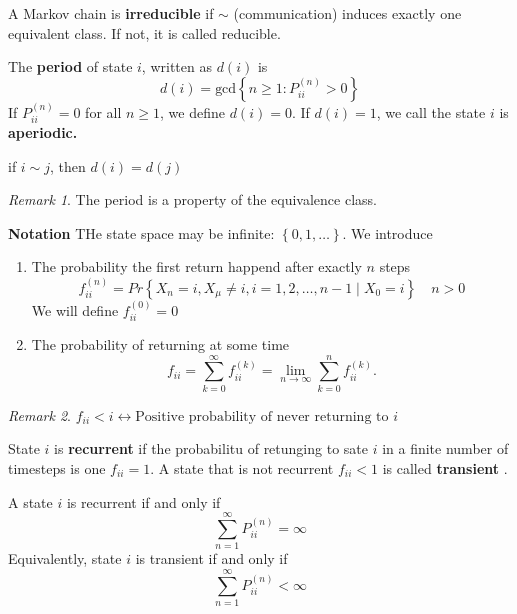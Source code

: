 \documentclass{article}
\theoremstyle{remark}
\newtheorem*{remark}{Remark}
\begin{document}
\begin{definition}
  A Markov chain is \textbf{irreducible}  if $ \sim $ (communication) induces exactly one equivalent class.  If not, it is called reducible. 
\end{definition}
\begin{definition}
  The \textbf{period}  of state $i$, written as $d\left( i \right)$ is \[
  d\left( i \right) = \text{gcd}\left\{ n \ge 1: P ^{(n)} _{ii} > 0 \right\}
  \] 
  If $P^{(n)} _{ii} = 0$ for all $n\ge 1$, we define $d\left( i \right) = 0$. If $d\left( i \right) = 1$, we call the state $i$ is \textbf{aperiodic.} 
\end{definition}
\begin{theorem}
  if $i \sim j$, then $d\left( i \right) = d\left( j \right)$
\end{theorem}
\begin{remark}
   The period is a property of the equivalence class.
\end{remark}

\textbf{Notation} THe state space may be infinite: $\left\{ 0,1, \ldots \right\}$. We introduce  
\begin{enumerate}[label=(\roman*)]
  \item The probability the first return happend after exactly $n$ steps \[
  f_{ii}^{(n)} = Pr \left \{ X_{n} = i, X_{\mu }\neq i, i  = 1,2, \ldots, n-1  \mid X_{0} = i  \right \}  \quad  n> 0 
  \] 
  We will define $f_{ii}^{(0)} = 0$
\item The probability of returning at some time \[
f_{ii} = \sum_{k= 0}^{\infty}  f_{ii}^{(k)} = \lim_{n \to  \infty}  \sum_{k= 0}^{n} f^{(k)} _{ii} .
\] 
\end{enumerate}
 \begin{remark}
   $f_{ii} < i \leftrightarrow  \text{Positive probability of never returning to $i$}$
 \end{remark}

 \begin{definition}
   State $i$ is \textbf{recurrent}  if the probabilitu of retunging to sate $i$ in a finite number of timesteps is one $f_{ii} = 1$. A state that is not recurrent $f_{ii} < 1$ is called \textbf{transient} .
 \end{definition}

 \begin{theorem}
   A state $i$ is recurrent if and only if \[
   \sum_{n=1}^{\infty} P_{ii}^{(n)} = \infty
   \] 
   Equivalently, state $i$ is transient if and only if \[
   \sum_{n=1}^{\infty}  P^{(n)}_{ii} < \infty
   \] 
 \end{theorem}
\end{document}
